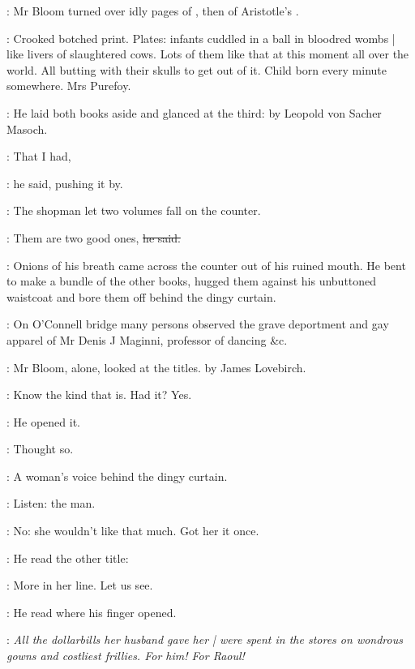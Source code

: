 :
Mr Bloom turned over idly pages of
,
then of Aristotle's .

\BloomInt:
Crooked botched print.
Plates:
infants cuddled in a ball in bloodred wombs |
like livers of slaughtered cows.
Lots of them like that at this moment all over the world.
All butting with their skulls to get out of it.
Child born every minute somewhere.
Mrs Purefoy.%

:
He laid both books aside and glanced at the third:
by Leopold von Sacher Masoch.

\Bloom:
That I had,

:
he said,
pushing it by.

:
The shopman let two volumes fall on the counter.

\shopman:
Them are two good ones,
\sout{he said.}

:
Onions of his breath came across the counter
out of his ruined mouth.
He bent to make a bundle of the other books,
hugged them against his unbuttoned waistcoat
and bore them off behind the dingy curtain.

\begin{mdframed}
    :
    On O'Connell bridge
    many persons observed the grave deportment
    and gay apparel of Mr Denis J Maginni,
    professor of dancing \&c.
\end{mdframed}

:
Mr Bloom, alone,
looked at the titles.
 by James Lovebirch.

\BloomInt:
Know the kind that is.
Had it?
Yes.

:
He opened it.

\BloomInt:
Thought so.

:
A woman's voice behind the dingy curtain.

\BloomInt:
Listen: the man.

\BloomInt:
No:
she wouldn't like that much.
Got her it once.

:
He read the other title:

\BloomInt:
More in her line.
Let us see.

:
He read where his finger opened.

\BloomInt:
\emph{All the dollarbills her husband gave her |
were spent in the stores
on wondrous gowns and costliest frillies.
For him!
For Raoul!}

